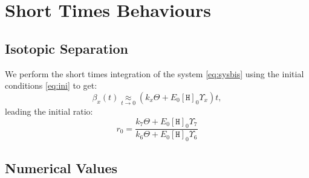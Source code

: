 \documentclass[aps,onecolumn,11pt]{revtex4}
\newcommand{\mychem}[1]{\mathtt{#1}}
\newcommand{\myconc}[1]{\left\lbrack{#1}\right\rbrack}
\newcommand{\spproton}{\mychem{H}}
\newcommand{\proton}{\myconc{\spproton}}
\begin{document}
\section{Short Times Behaviours}

\subsection{Isotopic Separation}
We perform the short times integration of the system \eqref{eq:sysbis} using the initial
conditions \eqref{eq:ini} to get:
\begin{equation}
\beta_x(t) \underset{t\to0}{\approx} \left(k_x \Theta + E_0 \proton_0 \Upsilon_x\right) t,
\end{equation}
leading the initial ratio:
\begin{equation}
r_0 = \dfrac{k_7\Theta+E_0 \proton_0 \Upsilon_7}{k_6\Theta+E_0 \proton_0 \Upsilon_6}
\end{equation}

\subsection{Numerical Values}
\end{document}
